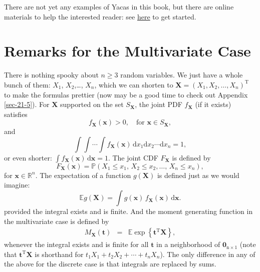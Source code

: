 \documentclass[captions=tableheading]{scrbook}
\begin{document}
There are not yet any examples of Yacas in this book, but there are online materials to help the interested reader: see \href{http://code.google.com/p/ryacas/}{here} to get started.
\section{Remarks for the Multivariate Case}
\label{sec-7-8}
\label{sec-Remarks-for-the-Multivariate}


There is nothing spooky about \(n\geq3\) random variables. We just have a whole bunch of them: \(X_{1}\), \(X_{2}\),\ldots{}, \(X_{n}\), which we can shorten to \(\mathbf{X}=(X_{1},X_{2},\ldots,X_{n})^{\mathrm{T}}\) to make the formulas prettier (now may be a good time to check out Appendix \ref{sec-21-5}). For \(\mathbf{X}\) supported on the set \(S_{\mathbf{X}}\), the joint PDF \(f_{\mathbf{X}}\) (if it exists) satisfies
\begin{equation}
f_{\mathbf{X}}(\mathbf{x})>0,\quad \mbox{for }\mathbf{x}\in S_{\mathbf{X}},
\end{equation}
and
\begin{equation}
\int\!\!\!\int\cdots\int f_{\mathbf{X}}(\mathbf{x})\,\mathrm{d} x_{1}\mathrm{d} x_{2}\cdots\mathrm{d} x_{n}=1,
\end{equation}
or even shorter: \(\int f_{\mathbf{X}}(\mathbf{x})\,\mathrm{d}\mathbf{x}=1\). The joint CDF \(F_{\mathbf{X}}\) is defined by 
\begin{equation}
F_{\mathbf{X}}(\mathbf{x})=\mathbb{P}(X_{1}\leq x_{1},\, X_{2}\leq x_{2},\ldots,\, X_{n}\leq x_{n}),
\end{equation}
for \(\mathbf{x}\in\mathbb{R}^{n}\). The expectation of a function \(g(\mathbf{X})\) is defined just as we would imagine:
\begin{equation}
\mathbb{E} g(\mathbf{X})=\int g(\mathbf{x})\, f_{\mathbf{X}}(\mathbf{x})\,\mathrm{d}\mathbf{x}.
\end{equation}
provided the integral exists and is finite. And the moment generating function in the multivariate case is defined by
\begin{eqnarray} 
M_{\mathbf{X}}(\mathbf{t}) & = & \mathbb{E}\exp\left\{ \mathbf{t}^{\mathrm{T}}\mathbf{X}\right\},
\end{eqnarray}
whenever the integral exists and is finite for all \(\mathbf{t}\) in a neighborhood of \(\mathbf{0}_{\mathrm{n}\times1}\) (note that \(\mathbf{t}^{\mathrm{T}}\mathbf{X}\) is shorthand for \(t_{1}X_{1}+t_{2}X_{2}+\cdots+t_{n}X_{n}\)). The only difference in any of the above for the discrete case is that integrals are replaced by sums. 
\end{document}
